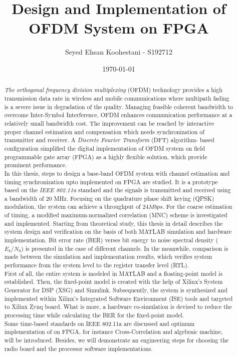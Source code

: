 \documentclass[12pt, oneside, a4paper]{scrartcl}
\begin{document}
\subject{Master's Thesis- Preliminary}
\title{Design and Implementation of OFDM System on FPGA}
\author{Seyed Ehsan Koohestani - S192712}
\date{\today}
\publishers{Politecnico di Torino}
\maketitle
\vspace{2cm}

\begin{abstract}
\textit{The orthogonal frequency division multiplexing} (OFDM) technology provides a high transmission data rate in wireless and mobile communications where multipath fading is a severe issue in degradation of the quality. Managing feasible coherent bandwidth to overcome Inter-Symbol Interference, OFDM enhances communication performance at a relatively small bandwidth cost. The improvement can be reached by interactive proper channel estimation and compensation which needs synchronization of transmitter and receiver. A \textit{Discrete Fourier Transform} (DFT) algorithm- based configuration simplified the digital implementation of OFDM system on field programmable gate array (FPGA) as a highly flexible solution, which provide prominent performance.\\
In this thesis, steps to design a base-band OFDM system with channel estimation and timing synchronization upto implemented on FPGA are studied. It is a prototype based on the \textit{IEEE 802.11a} standard and the signals is transmitted and received using a bandwidth of 20 MHz. Focusing on the quadrature phase shift keying (QPSK) modulation, the system can achieve a throughput of $24 Mbps$. For the coarse estimation of timing, a modified maximum-normalized correlation (MNC) scheme is investigated and implemented. Starting from theoretical study, this thesis in detail describes the system design and verification on the basis of both MATLAB simulation and hardware implementation. Bit error rate (BER) verses bit energy to noise spectral density ($E_{b}/N_{0}$) is presented in the case of different channels. In the meanwhile, comparison is made between the simulation and implementation results, which verifies system performance from the system level to the register transfer level (RTL).\\
First of all, the entire system is modeled in MATLAB and a floating-point model is established. Then, the fixed-point model is created with the help of Xilinx’s System Generator for DSP (XSG) and Simulink. Subsequently, the system is synthesized and implemented within Xilinx’s Integrated Software Environment (ISE) tools and targeted to Xilinx Zynq board. What is more, a hardware co-simulation is devised to reduce the processing time while calculating the BER for the fixed-point model.\\
Some time-based standards on IEEE 802.11a are discussed and optimum implementation of on FPGA, for instance Cross-Correlation and algebraic machine, will be introduced. Besides, we will demonstrate an engineering steps for choosing the radio board and the processor software implementations.\\
\end{abstract}
       
\end{document}
